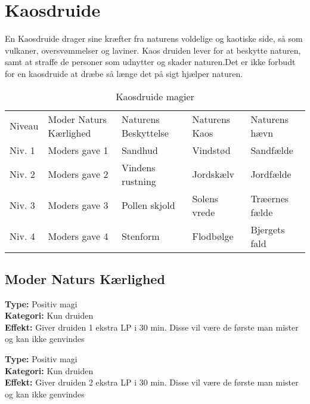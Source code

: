 \chapter*{Kaosdruide}
En Kaosdruide drager sine kræfter fra naturens voldelige og kaotiske side, så som vulkaner, oversvømmelser og laviner. Kaos druiden lever for at beskytte naturen, samt at straffe de personer som udnytter og skader naturen.Det er ikke forbudt for en kaosdruide at dræbe så længe det på sigt hjælper naturen.

\begin{table}[H]
    \centering
    \begin{tabular}{|p{}|p{}|p{}|p{}|p{}|}
    \hline
    \rowcolor{cerulean!80}
    \multicolumn{5}{c}{Kaosdruide magi}\\
    \hline
    \rowcolor{cerulean!40}
         Niveau &Moder Naturs Kærlighed & Naturens Beskyttelse & Naturens Kaos & Naturens hævn \\\hline
        Niv. 1 & Moders gave 1 & Sandhud & Vindstød & Sandfælde\\\hline
        Niv. 2 & Moders gave 2& Vindens rustning & Jordskælv & Jordfælde \\\hline
         Niv. 3 & Moders gave 3 & Pollen skjold & Solens vrede & Træernes fælde \\\hline
         Niv. 4 & Moders gave 4 & Stenform & Flodbølge & Bjergets fald\\\hline
         \end{tabular}
         \caption{Kaosdruide magier}
\end{table}

\section*{Moder Naturs Kærlighed}
\begin{mkær*}
\textbf{Type:} Positiv magi\\
\textbf{Kategori:} Kun druiden\\
\textbf{Effekt:} Giver druiden 1 ekstra LP i 30 min. Disse vil være de første man mister og kan ikke genvindes
\end{mkær*}

\begin{mkær*}
\textbf{Type:} Positiv magi\\ 
\textbf{Kategori:} Kun druiden\\
\textbf{Effekt:} Giver druiden 2 ekstra LP i 30 min. Disse vil være de første man mister og kan ikke genvindes
\end{mkær*}

